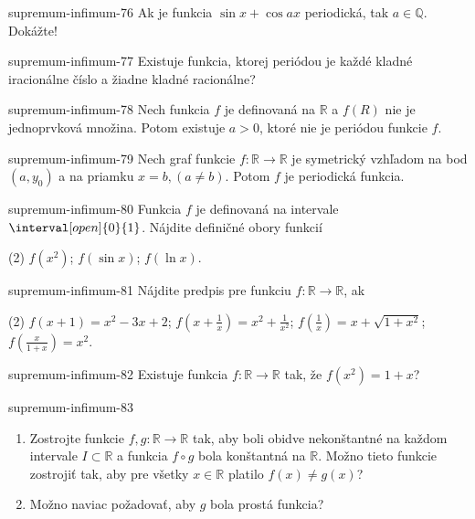\begin{defproblem}{supremum-infimum-76}
Ak je funkcia $\sin x +\cos ax$ periodická, tak $a\in\mathbb{Q}$. Dokážte!
\end{defproblem}

\begin{defproblem}{supremum-infimum-77}
Existuje funkcia, ktorej periódou je každé kladné iracionálne číslo a žiadne
kladné racionálne?
\end{defproblem}

\begin{defproblem}{supremum-infimum-78}
Nech funkcia $f$ je definovaná na $\mathbb{R}$ a $f(R)$ nie je jednoprvková
množina. Potom existuje $a>0$, ktoré nie je periódou funkcie $f$.
\end{defproblem}

\begin{defproblem}{supremum-infimum-79}
Nech graf funkcie $f:\mathbb{R}\rightarrow\mathbb{R}$ je symetrický vzhľadom na
bod $(a,y_0)$ a na priamku $x=b,(a\neq b)$. Potom $f$ je periodická funkcia.
\end{defproblem}

\begin{defproblem}{supremum-infimum-80}
Funkcia $f$ je definovaná na intervale $\interval[open]{0}{1}$. Nájdite
definičné obory funkcií
\begin{tasks}(2)
  \task $f(x^2)$;
  \task $f(\sin x)$;
  \task $f(\ln x)$.
\end{tasks}
\end{defproblem}

\begin{defproblem}{supremum-infimum-81}
Nájdite predpis pre funkciu $f:\mathbb{R}\rightarrow\mathbb{R}$, ak
\begin{tasks}(2)
  \task $f(x+1)=x^2-3x+2$;
  \task $f(x+\frac{1}{x})=x^2+\frac{1}{x^2}$;
  \task $f(\frac{1}{x})=x+\sqrt{1+x^2}$;
  \task $f(\frac{x}{1+x})=x^2$.
\end{tasks}
\end{defproblem}

\begin{defproblem}{supremum-infimum-82}
Existuje funkcia $f:\mathbb{R}\rightarrow\mathbb{R}$ tak, že $f(x^2)=1+x$?
\end{defproblem}

\begin{defproblem}{supremum-infimum-83}
\begin{enumerate}
\item Zostrojte funkcie $f,g:\mathbb{R}\rightarrow\mathbb{R}$ tak, aby boli obidve nekonštantné na každom intervale $I\subset\mathbb{R}$ a funkcia $f\circ g$ bola konštantná na $\mathbb{R}$. Možno tieto funkcie zostrojiť tak, aby pre všetky $x\in\mathbb{R}$ platilo $f(x)\neq g(x)$?
\item Možno naviac požadovať, aby $g$ bola prostá funkcia?
\end{enumerate}
\end{defproblem}

